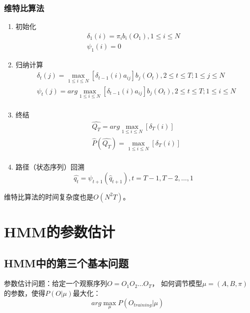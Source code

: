 \documentclass[a4paper,12pt]{book}
\begin{document}
    \subsubsection{维特比算法}
    \begin{enumerate}
        \item 初始化
        \begin{equation}
            \begin{split}
                \delta_1(i) = \pi_ib_i(O_1), 1 \le i \le N \\
                \psi_1(i) = 0
            \end{split}
        \end{equation}
        \item 归纳计算
        \begin{equation}
            \begin{split}
                &\delta_{t}(j) =  \max_{1 \le i \le N}[\delta_{t-1}(i)a_{ij}]b_j(O_t), 2 \le t \le T; 1 \le j \le N\\
                &\psi_t(j) =arg  \max_{1 \le i \le N}[\delta_{t-1}(i)a_{ij}]b_j(O_t), 2 \le t \le T; 1 \le i \le N\\
            \end{split}
        \end{equation}
        \item 终结
        \begin{equation}
            \begin{split}
                &\hat{Q_T} = arg \max_{1 \le i \le N}[\delta_{T}(i)]\\
                &\hat{P}(\hat{Q_T}) = \max_{1 \le i \le N}[\delta_{T}(i)]\\
            \end{split}
        \end{equation}
        \item 路径（状态序列）回溯
            \begin{equation}
                \hat{q_t} = \psi_{t+1}(\hat{q}_{t+1} ) , t =T-1, T-2, \dots, 1
            \end{equation}
    \end{enumerate}

        维特比算法的时间复杂度也是$O(N^2T)$。

    \section{HMM的参数估计}
    \subsection{HMM中的第三个基本问题}
    参数估计问题：给定一个观察序列$O=O_1O_2\dots O_T$，
    如何调节模型$\mu = (A, B, \pi)$的参数，使得$P(O|\mu)$最大化：
    \begin{equation}
        arg \max_{\mu} P(O_{training}|\mu)
    \end{equation}
\end{document}

